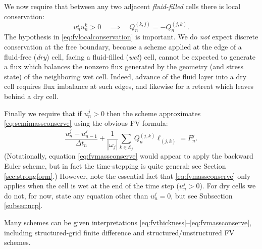 \documentclass[final,onefignum]{siamart190516}
\begin{document}
We now require that between any two adjacent \emph{fluid-filled} cells there is local conservation:
\begin{equation}
  u_n^j u_n^k > 0 \quad \implies \quad Q_n^{(k,j)}=-Q_n^{(j,k)}.  \label{eq:fvlocalconservation}
\end{equation}
The hypothesis in \eqref{eq:fvlocalconservation} is important.  We do \emph{not} expect discrete conservation at the free boundary, because a scheme applied at the edge of a fluid-free (\emph{dry}) cell, facing a fluid-filled (\emph{wet}) cell, cannot be expected to generate a flux which balances the nonzero flux generated by the geometry (and stress state) of the neighboring wet cell.  Indeed, advance of the fluid layer into a dry cell requires flux imbalance at such edges, and likewise for a retreat which leaves behind a dry cell.

Finally we require that if $u_n^j>0$ then the scheme approximates \eqref{eq:semimassconserve} using the obvious FV formula:
\begin{equation}
\frac{u_n^j - u_{n-1}^j}{\Delta t_n} + \frac{1}{|\omega_j|} \sum_{k\in \mathcal{E}_j} Q_n^{(j,k)} \ell_{(j,k)} = F_n^j. \label{eq:fvmassconserve}
\end{equation}
(Notationally, equation \eqref{eq:fvmassconserve} would appear to apply the backward Euler scheme, but in fact the time-stepping is quite general; see Section \ref{sec:strongform}.)  However, note the essential fact that \eqref{eq:fvmassconserve} only applies when the cell is wet at the end of the time step ($u_n^j>0$).  For dry cells we do not, for now, state any equation other than $u_n^j=0$, but see Subsection \ref{subsec:ncp}.

Many schemes can be given interpretations \eqref{eq:fvthickness}--\eqref{eq:fvmassconserve}, including structured-grid finite difference \cite{Bueler2016} and structured/unstructured FV \cite{LeVeque2002} schemes.
\end{document}

